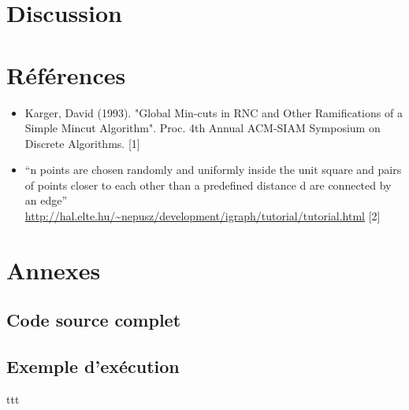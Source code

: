 \documentclass[a4paper,10pt]{article}
\begin{document}
\section {Discussion}

\section{Références}

\begin{itemize}
  \item Karger, David (1993). "Global Min-cuts in RNC and Other Ramifications of a Simple Mincut Algorithm". Proc. 4th Annual ACM-SIAM Symposium on Discrete Algorithms. [1]
  \item ``n points are chosen randomly and uniformly inside the unit square and pairs of points closer to each other than a predefined distance d are connected by an edge'' \url{http://hal.elte.hu/~nepusz/development/igraph/tutorial/tutorial.html} [2]
\end{itemize}


\section{Annexes}

\subsection{Code source complet}

\subsection{Exemple d'exécution}
ttt
\end{document}
